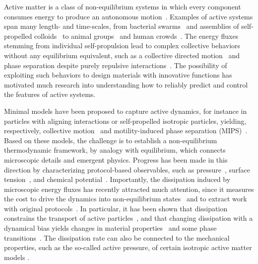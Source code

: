 \documentclass[superscriptaddress, twocolumn, prl, longbibliography, nofootinbib]{revtex4-1}
\begin{document}
Active matter is a class of non-equilibrium systems in which every component consumes energy to produce an autonomous motion~\cite{Marchetti2013, Bechinger2016, Marchetti2018}. Examples of active systems span many length- and time-scales, from bacterial swarms~\cite{Libchaber2000, Elgeti2015} and assemblies of self-propelled colloids~\cite{Bechinger2013, Palacci2013} to animal groups~\cite{Cavagna2010, Cavagna2014} and human crowds~\cite{Bottinelli2016, Bartolo2019}. The energy fluxes stemming from individual self-propulsion lead to complex collective behaviors without any equilibrium equivalent, such as a collective directed motion~\cite{Dauchot2010, Sood2014} and phase separation despite purely repulsive interactions~\cite{Bechinger2013, Palacci2013}. The possibility of exploiting such behaviors to design materials with innovative functions has motivated much research into understanding how to reliably predict and control the features of active systems.

Minimal models have been proposed to capture active dynamics, for instance in particles with aligning interactions or self-propelled isotropic particles, yielding, respectively, collective motion~\cite{Vicsek1995, Chate2020} and motility-induced phase separation (MIPS)~\cite{Fily2012, Cates2015}. Based on these models, the challenge is to establish a non-equilibrium thermodynamic framework, by analogy with equilibrium, which connects microscopic details and emergent physics. Progress has been made in this direction by characterizing protocol-based observables, such as pressure~\cite{Marchetti2014, Brady2014, Solon2015}, surface tension~\cite{Speck2015, Paliwal2017, Zakine2020}, and chemical potential~\cite{Paliwal2018, Guioth2019}. Importantly, the dissipation induced by microscopic energy fluxes has recently attracted much attention, since it measures the cost to drive the dynamics into non-equilibrium states~\cite{Shim2016, Suma2017, Junco2018, Spinney2018, Murrell2018, Murrell2019, Markovich2020} and to extract work with original protocols~\cite{Zakine2017, Martin2018, Pietzonka2019, Liao2020, Ekeh2020, Kroy2020}. In particular, it has been shown that dissipation constrains the transport of active particles~\cite{Suri2019, Suri2020}, and that changing dissipation with a dynamical bias yields changes in material properties~\cite{Suri2019} and some phase transitions~\cite{Nemoto2019, Suri2020,GrandPre2020}. The dissipation rate can also be connected to the mechanical properties, such as the so-called active pressure, of certain isotropic active matter models \cite{Solon2015}.
\end{document}
